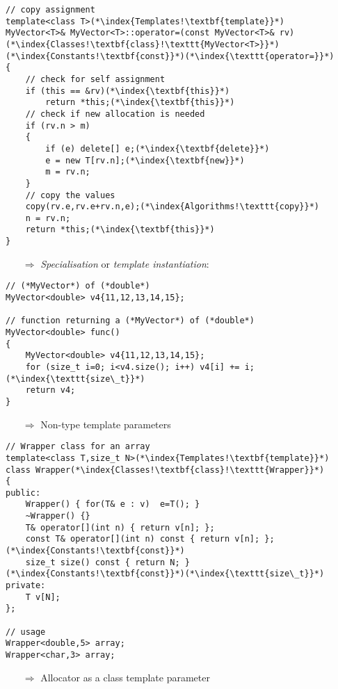 \documentclass[10pt]{book}
\begin{document}
\begin{lstlisting}
// copy assignment
template<class T>(*\index{Templates!\textbf{template}}*)
MyVector<T>& MyVector<T>::operator=(const MyVector<T>& rv)(*\index{Classes!\textbf{class}!\texttt{MyVector<T>}}*)(*\index{Constants!\textbf{const}}*)(*\index{\texttt{operator=}}*)
{
    // check for self assignment
    if (this == &rv)(*\index{\textbf{this}}*)
        return *this;(*\index{\textbf{this}}*)
    // check if new allocation is needed
    if (rv.n > m)
    {
        if (e) delete[] e;(*\index{\textbf{delete}}*)
        e = new T[rv.n];(*\index{\textbf{new}}*)
        m = rv.n;
    }
    // copy the values
    copy(rv.e,rv.e+rv.n,e);(*\index{Algorithms!\texttt{copy}}*)
    n = rv.n;
    return *this;(*\index{\textbf{this}}*)
}
\end{lstlisting}
\begin{enumerate}
\item[$\Rightarrow$] \emph{Specialisation} or \emph{template instantiation}:
\end{enumerate}
\begin{lstlisting}
// (*MyVector*) of (*double*)
MyVector<double> v4{11,12,13,14,15};

// function returning a (*MyVector*) of (*double*)
MyVector<double> func()
{
    MyVector<double> v4{11,12,13,14,15};
    for (size_t i=0; i<v4.size(); i++) v4[i] += i;(*\index{\texttt{size\_t}}*)
    return v4;
}
\end{lstlisting}
\begin{enumerate}
\item[$\Rightarrow$] Non-type template parameters
\end{enumerate}
\begin{lstlisting}
// Wrapper class for an array 
template<class T,size_t N>(*\index{Templates!\textbf{template}}*)
class Wrapper(*\index{Classes!\textbf{class}!\texttt{Wrapper}}*)
{
public:
    Wrapper() { for(T& e : v)  e=T(); }
    ~Wrapper() {}
    T& operator[](int n) { return v[n]; };
    const T& operator[](int n) const { return v[n]; };(*\index{Constants!\textbf{const}}*)
    size_t size() const { return N; }(*\index{Constants!\textbf{const}}*)(*\index{\texttt{size\_t}}*)
private:
    T v[N];
};

// usage
Wrapper<double,5> array;
Wrapper<char,3> array;
\end{lstlisting}
\begin{enumerate}
\item[$\Rightarrow$] Allocator as a class template parameter
\end{enumerate}
\end{document}
